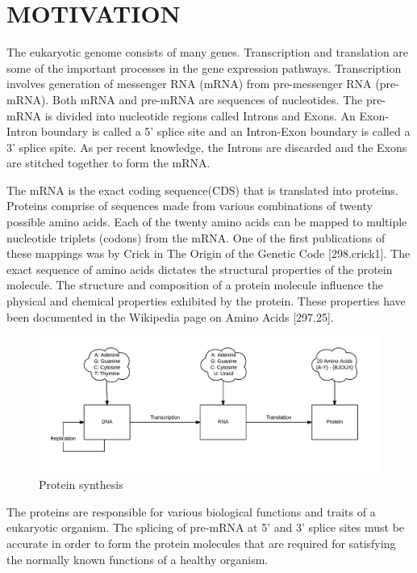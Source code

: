 \documentclass[12pt,a4paper]{article}
\begin{document}
    \thispagestyle{empty}
	\newpage
	
	\tableofcontents
	\thispagestyle{empty}
	\newpage
	
	\clearpage
    \doublespacing
	\section{\large MOTIVATION}
    The eukaryotic genome consists of many genes. Transcription and translation are some of the important processes in the gene expression pathways. Transcription involves generation of messenger RNA (mRNA) from pre-messenger RNA (pre-mRNA). Both mRNA and pre-mRNA are sequences of nucleotides. The pre-mRNA is divided into nucleotide regions called Introns and Exons. An Exon-Intron boundary is called a 5’ splice site and an Intron-Exon boundary is called a 3’ splice spite. As per recent knowledge, the Introns are discarded and the Exons are stitched together to form the mRNA. \par
    The mRNA is the exact coding sequence(CDS) that is translated into proteins. Proteins comprise of sequences made from various combinations of twenty possible amino acids. Each of the twenty amino acids can be mapped to multiple nucleotide triplets (codons) from the mRNA. One of the first publications of these mappings was by Crick in The Origin of the Genetic Code [298.crick1]. The exact sequence of amino acids dictates the structural properties of the protein molecule. The structure and composition of a protein molecule influence the physical and chemical properties exhibited by the protein. These properties have been documented in the Wikipedia page on Amino Acids [297.25]. \par
	\begin{figure}[h]
		\includegraphics[width=\textwidth]{synthesis}
		\caption{Protein synthesis}
		\centering
	\end{figure}
	The proteins are responsible for various biological functions and traits of a eukaryotic organism. The splicing of pre-mRNA at 5’ and 3’ splice sites must be accurate in order to form the protein molecules that are required for satisfying the normally known functions of a healthy organism. \par
\end{document}
